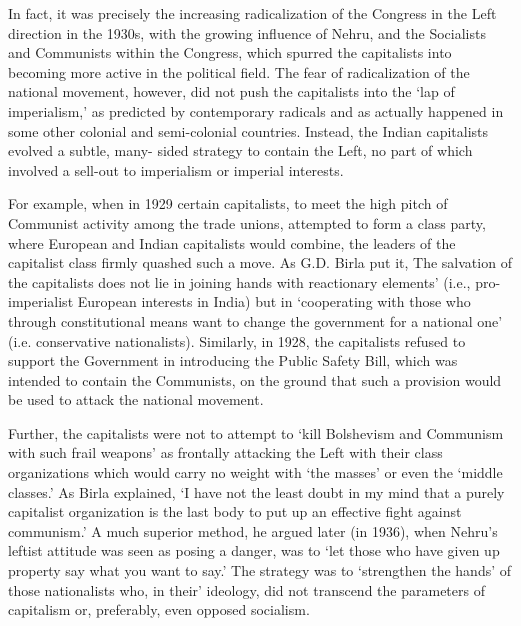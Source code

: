 In fact, it was precisely the increasing radicalization of the Congress in the Left direction in the 1930s, with the growing influence of Nehru, and the Socialists and Communists within the Congress, which spurred the capitalists into becoming more active in the political field. The fear of radicalization of the national movement, however, did not push the capitalists into the ‘lap of imperialism,’ as predicted by contemporary radicals and as actually happened in some other colonial and semi-colonial countries. Instead, the Indian capitalists evolved a subtle, many- sided strategy to contain the Left, no part of which involved a sell-out to imperialism or imperial interests. 

For example, when in 1929 certain capitalists, to meet the high pitch of Communist activity among the trade unions, attempted to form a class party, where European and Indian capitalists would combine, the leaders of the capitalist class firmly quashed such a move. As G.D. Birla put it, The salvation of the capitalists does not lie in joining hands with reactionary elements’ (i.e., pro-imperialist European interests in India) but in ‘cooperating with those who through constitutional means want to change the government for a national one’ (i.e. conservative nationalists). Similarly, in 1928, the capitalists refused to support the Government in introducing the Public Safety Bill, which was intended to contain the Communists, on the ground that such a provision would be used to attack the national movement. 

Further, the capitalists were not to attempt to ‘kill Bolshevism and Communism with such frail weapons’ as frontally attacking the Left with their class organizations which would carry no weight with ‘the masses’ or even the ‘middle classes.’ As Birla explained, ‘I have not the least doubt in my mind that a purely capitalist organization is the last body to put up an effective fight against communism.’ A much superior method, he argued later (in 1936), when Nehru’s leftist attitude was seen as posing a danger, was to ‘let those who have given up property say what you want to say.’ The strategy was to ‘strengthen the hands’ of those nationalists who, in their’ ideology, did not transcend the parameters of capitalism or, preferably, even opposed socialism. 

